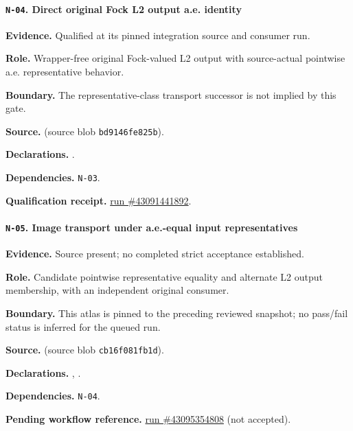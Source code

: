 \paragraph{\texttt{N-04}. Direct original Fock L2 output a.e. identity}
\noindent\textbf{Evidence.} Qualified at its pinned integration source and consumer run.
\par\noindent\textbf{Role.} Wrapper-free original Fock-valued L2 output with source-actual pointwise a.e. representative behavior.
\par\noindent\textbf{Boundary.} The representative-class transport successor is not implied by this gate.
\par\noindent\textbf{Source.}  (source blob \texttt{bd9146fe825b}).
\par\noindent\textbf{Declarations.} .
\par\noindent\textbf{Dependencies.} \texttt{N-03}.
\par\noindent\textbf{Qualification receipt.} \href{https://github.com/etblink/math/actions/runs/43091441892}{run \#43091441892}.
\medskip

\paragraph{\texttt{N-05}. Image transport under a.e.-equal input representatives}
\noindent\textbf{Evidence.} Source present; no completed strict acceptance established.
\par\noindent\textbf{Role.} Candidate pointwise representative equality and alternate L2 output membership, with an independent original consumer.
\par\noindent\textbf{Boundary.} This atlas is pinned to the preceding reviewed snapshot; no pass/fail status is inferred for the queued run.
\par\noindent\textbf{Source.}  (source blob \texttt{cb16f081fb1d}).
\par\noindent\textbf{Declarations.} , .
\par\noindent\textbf{Dependencies.} \texttt{N-04}.
\par\noindent\textbf{Pending workflow reference.} \href{https://github.com/etblink/math/actions/runs/43095354808}{run \#43095354808} (not accepted).
\medskip

